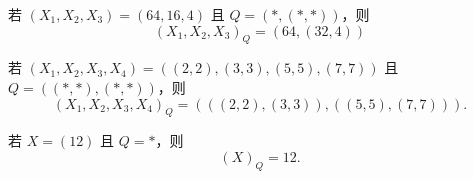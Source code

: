 



\begin{example}
    若 $(X_1,X_2,X_3) = (64,16,4)$ 且 $Q = (*,(*,*))$，则
    \[
    (X_1,X_2,X_3)_Q = (64,(32,4))
    \]
\end{example}

\begin{example}
    若 $(X_1,X_2,X_3,X_4) = ( (2,2), (3,3), (5,5), (7,7))$ 且 $Q = ((*,*),(*,*))$，则
    \[
    (X_1,X_2,X_3,X_4)_Q = (((2,2),(3,3)),((5,5),(7,7))).
    \]
\end{example}
\begin{example}
    若 $X = (12)$ 且 $Q = *$，则
    \[
    (X)_Q = 12.
    \]
\end{example}


